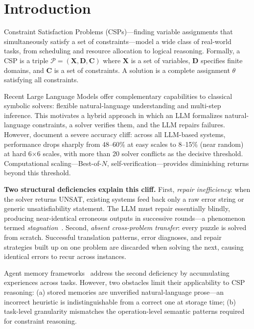 
\section{Introduction}

Constraint Satisfaction Problems (CSPs)—finding variable assignments that simultaneously satisfy a set of constraints—model a wide class of real-world tasks, from scheduling and resource allocation to logical reasoning. Formally, a CSP is a triple $\mathcal{P} = (\mathbf{X}, \mathbf{D}, \mathbf{C})$ where $\mathbf{X}$ is a set of variables, $\mathbf{D}$ specifies finite domains, and $\mathbf{C}$ is a set of constraints. A solution is a complete assignment $\theta$ satisfying all constraints.

Recent Large Language Models offer complementary capabilities to classical symbolic solvers: flexible natural-language understanding and multi-step inference. This motivates a hybrid approach in which an LLM formalizes natural-language constraints, a solver verifies them, and the LLM repairs failures. However, \citet{Lin2025} document a severe accuracy cliff: across all LLM-based systems, performance drops sharply from 48--60\% at easy scales to 8--15\% (near random) at hard 6$\times$6 scales, with more than 20 solver conflicts as the decisive threshold. Computational scaling—Best-of-$N$, self-verification—provides diminishing returns beyond this threshold.

\textbf{Two structural deficiencies explain this cliff.} First, \textit{repair inefficiency}: when the solver returns UNSAT, existing systems feed back only a raw error string or generic unsatisfiability statement. The LLM must repair essentially blindly, producing near-identical erroneous outputs in successive rounds—a phenomenon termed \textit{stagnation}~\citep{Lin2025}. Second, \textit{absent cross-problem transfer}: every puzzle is solved from scratch. Successful translation patterns, error diagnoses, and repair strategies built up on one problem are discarded when solving the next, causing identical errors to recur across instances.

Agent memory frameworks~\citep{Shinn2023,Zhao2024,Ouyang2025} address the second deficiency by accumulating experiences across tasks. However, two obstacles limit their applicability to CSP reasoning: (a) stored memories are unverified natural-language prose—an incorrect heuristic is indistinguishable from a correct one at storage time; (b) task-level granularity mismatches the operation-level semantic patterns required for constraint reasoning.

